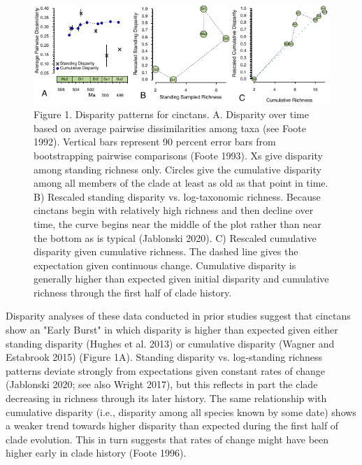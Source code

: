 \documentclass{article}
\begin{document}
\begin{figure}
  \includegraphics[width=\textwidth]{figures/Cinctan Disparity 3Ways Horizontal.pdf}

  \caption{Figure 1. Disparity patterns for cinctans.  A. Disparity over time based on average pairwise dissimilarities among taxa (see Foote 1992).  Vertical bars represent 90 percent error bars from bootstrapping pairwise comparisons (Foote 1993).  Xs give disparity among standing richness only.  Circles give the cumulative disparity among all members of the clade at least as old as that point in time.  B) Rescaled standing disparity vs. log-taxonomic richness. Because cinctans begin with relatively high richness and then decline over time, the curve begins near the middle of the plot rather than near the bottom as is typical (Jablonski 2020). C) Rescaled cumulative disparity given cumulative richness.  The dashed line gives the expectation given continuous change.  Cumulative disparity is generally higher than expected given initial disparity and cumulative richness through the first half of clade history. }
\end{figure}

Disparity analyses of these data conducted in prior studies suggest that cinctans show an "Early Burst" in which disparity is higher than expected given either standing disparity (Hughes et al. 2013) or cumulative disparity (Wagner and Estabrook 2015) (Figure 1A).  Standing disparity vs. log-standing richness patterns deviate strongly from expectations given constant rates of change (Jablonski 2020; see also Wright 2017), but this reflects in part the clade decreasing in richness through its later history.  The same relationship with cumulative disparity (i.e., disparity among all species known by some date) shows a weaker trend towards higher disparity than expected during the first half of clade evolution.  This in turn suggests that rates of change might have been higher early in clade history (Foote 1996). 
\end{document}
